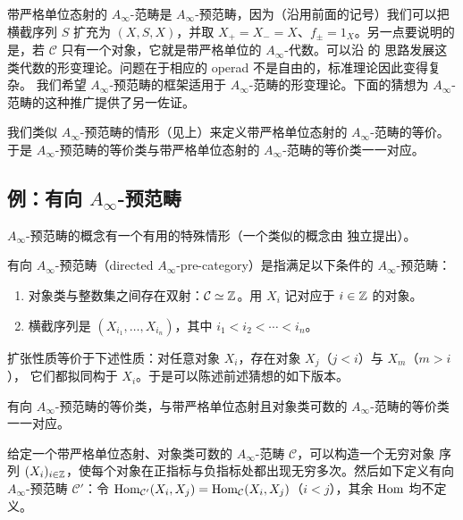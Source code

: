 带严格单位态射的 $A_\infty$-范畴是 $A_\infty$-预范畴，因为（沿用前面的记号）我们可以把
横截序列 $S$ 扩充为 $(X,S,X)$，并取 $X_+=X_-=X$、$f_\pm=1_X$。另一点要说明的是，若
$\mathcal{C}$ 只有一个对象，它就是带严格单位的 $A_\infty$-代数。可以沿 \cite{KoS1} 的
思路发展这类代数的形变理论。问题在于相应的 operad 不是自由的，标准理论因此变得复杂。
我们希望 $A_\infty$-预范畴的框架适用于 $A_\infty$-范畴的形变理论。下面的猜想为
$A_\infty$-范畴的这种推广提供了另一佐证。

\begin{conj}
我们类似 $A_\infty$-预范畴的情形（见上）来定义带严格单位态射的 $A_\infty$-范畴的等价。
于是 $A_\infty$-预范畴的等价类与带严格单位态射的 $A_\infty$-范畴的等价类一一对应。
\end{conj}

\subsection{例：有向 $A_\infty$-预范畴}

$A_\infty$-预范畴的概念有一个有用的特殊情形（一个类似的概念由 \cite{Se} 独立提出）。

\begin{dfn}
有向 $A_\infty$-预范畴（directed $A_\infty$-pre-category）是指满足以下条件的
$A_\infty$-预范畴：
\begin{enumerate}[label=\alph*),leftmargin=2.2em,itemsep=1pt,topsep=2pt]
\item 对象类与整数集之间存在双射：$\mathcal{C}\simeq\mathbb{Z}$。用 $X_i$ 记对应于 $i\in\mathbb{Z}$
  的对象。
\item 横截序列是 $(X_{i_1},\dots,X_{i_n})$，其中 $i_1<i_2<\cdots<i_n$。
\end{enumerate}
\end{dfn}

扩张性质等价于下述性质：对任意对象 $X_i$，存在对象 $X_j$（$j<i$）与 $X_m$（$m>i$），
它们都拟同构于 $X_i$。于是可以陈述前述猜想的如下版本。

\begin{conj}
有向 $A_\infty$-预范畴的等价类，与带严格单位态射且对象类可数的 $A_\infty$-范畴的等价类
一一对应。
\end{conj}

给定一个带严格单位态射、对象类可数的 $A_\infty$-范畴 $\mathcal{C}$，可以构造一个无穷对象
序列 $(X_i)_{i\in\mathbb{Z}}$，使每个对象在正指标与负指标处都出现无穷多次。然后如下定义有向
$A_\infty$-预范畴 $\mathcal{C}'$：令 $\operatorname{Hom}_{\mathcal{C}'}(X_i,X_j)=
\operatorname{Hom}_{\mathcal{C}}(X_i,X_j)$（$i<j$），其余 $\operatorname{Hom}$ 均不定义。

